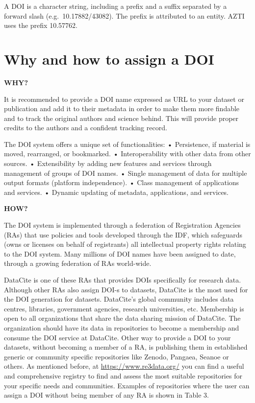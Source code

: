\documentclass[
]{book}
\begin{document}
A DOI is a character string, including a prefix and a suffix separated by a forward slash (e.g.~10.17882/43082). The prefix is attributed to an entity. AZTI uses the prefix 10.57762.

\hypertarget{why-and-how-to-assign-a-doi}{%
\chapter{Why and how to assign a DOI}\label{why-and-how-to-assign-a-doi}}

\textbf{WHY?}

It is recommended to provide a DOI name expressed as URL to your dataset or publication and add it to their metadata in order to make them more findable and to track the original authors and science behind. This will provide proper credits to the authors and a confident tracking record.

The DOI system offers a unique set of functionalities:
• Persistence, if material is moved, rearranged, or bookmarked.
• Interoperability with other data from other sources.
• Extensibility by adding new features and services through management of groups of DOI names.
• Single management of data for multiple output formats (platform independence).
• Class management of applications and services.
• Dynamic updating of metadata, applications, and services.

\textbf{HOW?}

The DOI system is implemented through a federation of Registration Agencies (RAs) that use policies and tools developed through the IDF, which safeguards (owns or licenses on behalf of registrants) all intellectual property rights relating to the DOI system. Many millions of DOI names have been assigned to date, through a growing federation of RAs world-wide.

DataCite is one of these RAs that provides DOIs specifically for research data. Although other RAs also assign DOI-s to datasets, DataCite is the most used for the DOI generation for datasets. DataCite's global community includes data centres, libraries, government agencies, research universities, etc. Membership is open to all organizations that share the data sharing mission of DataCite. The organization should have its data in repositories to become a membership and consume the DOI service at DataCite. Other way to provide a DOI to your datasets, without becoming a member of a RA, is publishing them in established generic or community specific repositories like Zenodo, Pangaea, Seanoe or others. As mentioned before, at \url{https://www.re3data.org/} you can find a useful and comprehensive registry to find and assess the most suitable repositories for your specific needs and communities. Examples of repositories where the user can assign a DOI without being member of any RA is shown in Table 3.
\end{document}
